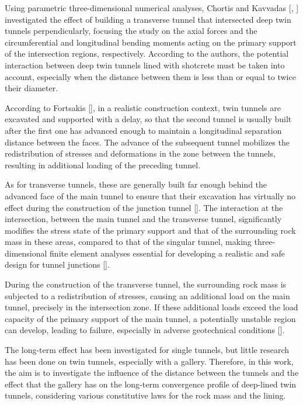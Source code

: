 \documentclass[a4paper,fleqn]{cas-sc}
\begin{document}
Using parametric three-dimensional numerical analyses, Chortis and Kavvadas [, ] investigated the effect of building a transverse tunnel that intersected deep twin tunnels perpendicularly, focusing the study on the axial forces and the circumferential and longitudinal bending moments acting on the primary support of the intersection regions, respectively. According to the authors, the potential interaction between deep twin tunnels lined with shotcrete must be taken into account, especially when the distance between them is less than or equal to twice their diameter.

According to Fortsakis [], in a realistic construction context, twin tunnels are excavated and supported with a delay, so that the second tunnel is usually built after the first one has advanced enough to maintain a longitudinal separation distance between the faces. The advance of the subsequent tunnel mobilizes the redistribution of stresses and deformations in the zone between the tunnels, resulting in additional loading of the preceding tunnel.

As for transverse tunnels, these are generally built far enough behind the advanced face of the main tunnel to ensure that their excavation has virtually no effect during the construction of the junction tunnel []. The interaction at the intersection, between the main tunnel and the transverse tunnel, significantly modifies the stress state of the primary support and that of the surrounding rock mass in these areas, compared to that of the singular tunnel, making three-dimensional finite element analyses essential for developing a realistic and safe design for tunnel junctions [].

During the construction of the transverse tunnel, the surrounding rock mass is subjected to a redistribution of stresses, causing an additional load on the main tunnel, precisely in the intersection zone. If these additional loads exceed the load capacity of the primary support of the main tunnel, a potentially unstable region can develop, leading to failure, especially in adverse geotechnical conditions [].

The long-term effect has been investigated for single tunnels, but little research has been done on twin tunnels, especially with a gallery. Therefore, in this work, the aim is to investigate the influence of the distance between the tunnels and the effect that the gallery has on the long-term convergence profile of deep-lined twin tunnels, considering various constitutive laws for the rock mass and the lining.
\end{document}
